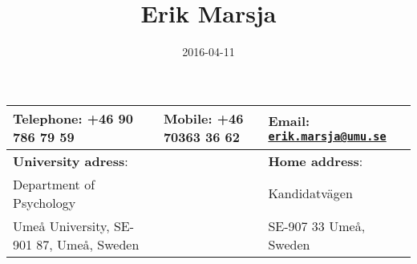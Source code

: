 \documentclass[]{article}
\title{Erik Marsja}
\author{}
\date{2016-04-11}
\begin{document}
\maketitle

\begin{longtable}[c]{@{}lll@{}}
\toprule
\begin{minipage}[b]{0.41\columnwidth}\raggedright\strut
\textbf{Telephone}: +46 90 786 79 59
\strut\end{minipage} &
\begin{minipage}[b]{0.27\columnwidth}\raggedright\strut
\textbf{Mobile}: +46 70363 36 62
\strut\end{minipage} &
\begin{minipage}[b]{0.27\columnwidth}\raggedright\strut
\textbf{Email}:
\href{mailto:erik.marsja@umu.se}{\nolinkurl{erik.marsja@umu.se}}
\strut\end{minipage}\tabularnewline
\midrule
\endhead
\begin{minipage}[t]{0.41\columnwidth}\raggedright\strut
\textbf{University adress}:
\strut\end{minipage} &
\begin{minipage}[t]{0.27\columnwidth}\raggedright\strut
\strut\end{minipage} &
\begin{minipage}[t]{0.27\columnwidth}\raggedright\strut
\textbf{Home address}:
\strut\end{minipage}\tabularnewline
\begin{minipage}[t]{0.41\columnwidth}\raggedright\strut
Department of Psychology
\strut\end{minipage} &
\begin{minipage}[t]{0.27\columnwidth}\raggedright\strut
\strut\end{minipage} &
\begin{minipage}[t]{0.27\columnwidth}\raggedright\strut
Kandidatvägen
\strut\end{minipage}\tabularnewline
\begin{minipage}[t]{0.41\columnwidth}\raggedright\strut
Umeå University, SE-901 87, Umeå, Sweden
\strut\end{minipage} &
\begin{minipage}[t]{0.27\columnwidth}\raggedright\strut
\strut\end{minipage} &
\begin{minipage}[t]{0.27\columnwidth}\raggedright\strut
SE-907 33 Umeå, Sweden
\strut\end{minipage}\tabularnewline
\bottomrule
\end{longtable}
\end{document}
